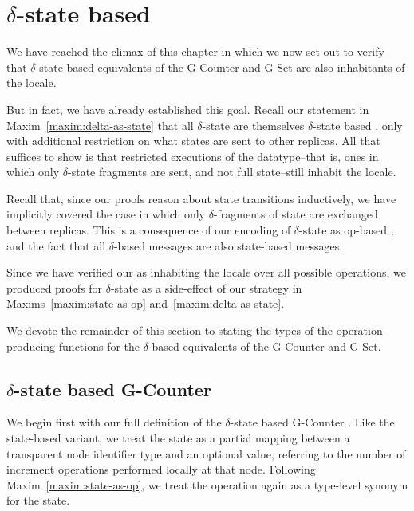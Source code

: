 \section{$\delta$-state based \CRDTs}
\label{sec:isabelle-delta-crdts}

We have reached the climax of this chapter in which we now set out to verify
that $\delta$-state based \CRDT equivalents of the G-Counter and G-Set are also
inhabitants of the \SEC locale.

But in fact, we have already established this goal. Recall our statement in
Maxim~\ref{maxim:delta-as-state} that all $\delta$-state \CRDTs are themselves
$\delta$-state based \CRDTs, only with additional restriction on what states are
sent to other replicas. All that suffices to show is that restricted executions
of the datatype--that is, ones in which only $\delta$-state fragments are sent,
and not full state--still inhabit the \SEC locale.

Recall that, since our proofs reason about state transitions inductively, we
have implicitly covered the case in which only $\delta$-fragments of state are
exchanged between replicas. This is a consequence of our encoding of
$\delta$-state \CRDTs as op-based \CRDTs, and the fact that all $\delta$-based
\CRDT messages are also state-based \CRDT messages.

Since we have verified our \CRDTs as inhabiting the \SEC locale over all
possible operations, we produced proofs for $\delta$-state \CRDTs as a
side-effect of our strategy in Maxims~\ref{maxim:state-as-op}
and~\ref{maxim:delta-as-state}.

We devote the remainder of this section to stating the types of the
operation-producing functions for the $\delta$-based \CRDT equivalents of the
G-Counter and G-Set.

\subsection{$\delta$-state based G-Counter}
\label{sec:isabelle-delta-gcounter}

We begin first with our full definition of the $\delta$-state based G-Counter
\CRDT. Like the state-based variant, we treat the state as a partial mapping
between a transparent node identifier type and an optional value, referring to
the number of increment operations performed locally at that node. Following
Maxim~\ref{maxim:state-as-op}, we treat the operation again as a type-level
synonym for the state.

